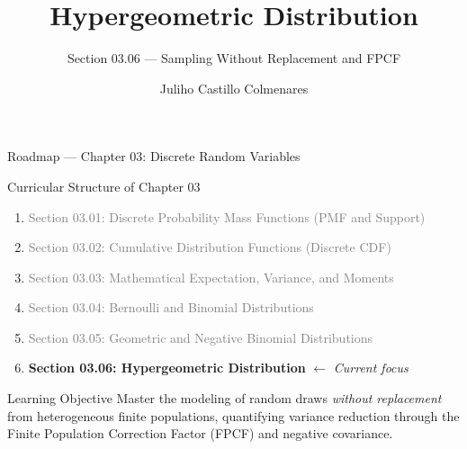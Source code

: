 \documentclass[aspectratio=169,xcolor={dvipsnames,table}]{beamer}
\title{Hypergeometric Distribution}
\subtitle{Section 03.06 --- Sampling Without Replacement and FPCF}
\author[J. Castillo Colmenares]{Juliho Castillo Colmenares}
\institute[Tec de Monterrey]{Tecnológico de Monterrey}
\date{\vspace{-1.5cm}}
\begin{document}
\begin{frame}[plain]
	\titlepage
\end{frame}

\begin{frame}{Roadmap --- Chapter 03: Discrete Random Variables}
	\vspace{-0.15cm}
	\begin{block}{Curricular Structure of Chapter 03}
		\footnotesize
		\begin{enumerate}
			\itemsep=0.03cm
			\item \textcolor{gray}{Section 03.01: Discrete Probability Mass Functions (PMF and Support)}
			\item \textcolor{gray}{Section 03.02: Cumulative Distribution Functions (Discrete CDF)}
			\item \textcolor{gray}{Section 03.03: Mathematical Expectation, Variance, and Moments}
			\item \textcolor{gray}{Section 03.04: Bernoulli and Binomial Distributions}
			\item \textcolor{gray}{Section 03.05: Geometric and Negative Binomial Distributions}
			\item \textbf{\textcolor{TecRojo}{Section 03.06: Hypergeometric Distribution}} $\leftarrow$ \emph{Current focus}
		\end{enumerate}
	\end{block}
	\vspace{-0.2cm}
	\begin{alertblock}{Learning Objective}
		\scriptsize
		Master the modeling of random draws \emph{without replacement} from heterogeneous finite populations, quantifying variance reduction through the Finite Population Correction Factor (FPCF) and negative covariance.
	\end{alertblock}
\end{frame}
\end{document}
